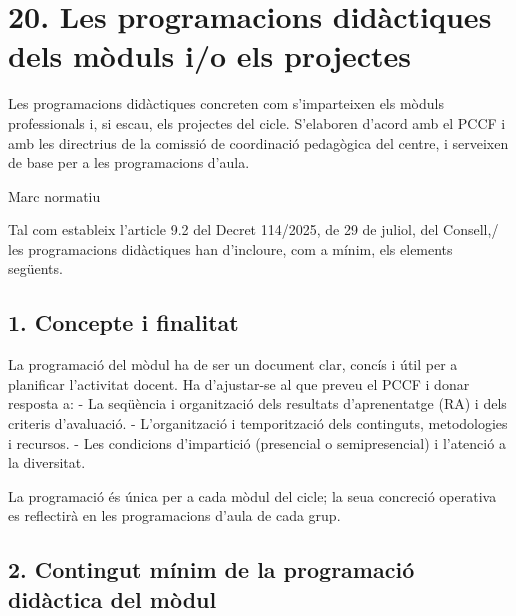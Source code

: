 \documentclass[
  paper=a4,
  ,captions=tableheading
]{scrartcl}
\begin{document}
\hypertarget{les-programacions-diduxe0ctiques-dels-muxf2duls-io-els-projectes}{%
\section{20. Les programacions didàctiques dels mòduls i/o els
projectes}\label{les-programacions-diduxe0ctiques-dels-muxf2duls-io-els-projectes}}

Les programacions didàctiques concreten com s'imparteixen els mòduls
professionals i, si escau, els projectes del cicle. S'elaboren d'acord
amb el PCCF i amb les directrius de la comissió de coordinació
pedagògica del centre, i serveixen de base per a les programacions
d'aula.

Marc normatiu

Tal com estableix l'article 9.2 del Decret 114/2025, de 29 de juliol,
del Consell,/ les programacions didàctiques han d'incloure, com a mínim,
els elements següents.

\hypertarget{concepte-i-finalitat}{%
\subsection{1. Concepte i finalitat}\label{concepte-i-finalitat}}

La programació del mòdul ha de ser un document clar, concís i útil per a
planificar l'activitat docent. Ha d'ajustar-se al que preveu el PCCF i
donar resposta a: - La seqüència i organització dels resultats
d'aprenentatge (RA) i dels criteris d'avaluació. - L'organització i
temporització dels continguts, metodologies i recursos. - Les condicions
d'impartició (presencial o semipresencial) i l'atenció a la diversitat.

La programació és única per a cada mòdul del cicle; la seua concreció
operativa es reflectirà en les programacions d'aula de cada grup.

\hypertarget{contingut-muxednim-de-la-programaciuxf3-diduxe0ctica-del-muxf2dul}{%
\subsection{2. Contingut mínim de la programació didàctica del
mòdul}\label{contingut-muxednim-de-la-programaciuxf3-diduxe0ctica-del-muxf2dul}}
\end{document}
